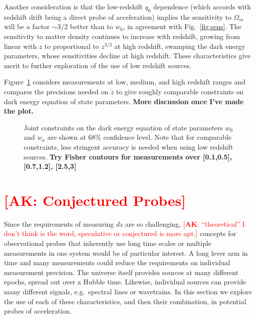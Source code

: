 \documentclass[preprint2, 10pt]{aastex}
\newcommand{\alex}[1]{\textcolor{red}{[{\bf AK}: #1]}}
\newcommand{\om}{\Omega_m}
\begin{document}
Another consideration is that the low-redshift $q_0$ dependence (which 
accords with redshift drift being a direct probe of acceleration) implies 
the sensitivity to $\om$ will be a factor $\sim3/2$ better than to $w_0$, 
in agreement with Fig.~\ref{fig:sens}. The sensitivity to matter density 
continues to increase with redshift, growing from linear with $z$ to 
proportional to $z^{3/2}$ at high redshift, swamping the dark energy 
parameters, whose sensitivities decline at high redshift. These 
characteristics give merit to further exploration of the use of 
low redshift sources. 

Figure~\ref{fig:fisher} considers measurements at low, medium, and 
high redshift ranges and compares the precisions needed on $\dot z$ to 
give roughly comparable constraints on dark energy equation of state 
parameters. 
{\bf More discussion once I've made the plot.} 


\begin{figure}
   \centering
\caption{Joint constraints on the dark energy equation of state parameters 
$w_0$ and $w_a$ are shown at 68\% confidence level. Note that for comparable 
constraints, less stringent accuracy is needed when using low redshift 
sources. 
{\bf Try Fisher contours for measurements over [0.1,0.5], [0.7,1.2], [2.5,3]} 
}
\label{fig:fisher} 
\end{figure}




\section{\alex{Conjectured Probes}} \label{sec:methods} 

Since the requirements of measuring $dz$ are so challenging, \alex{``theoretical'' I don't think
is the word, speculative or  conjectured is more apt.}
concepts for observational probes that inherently use long time scales or 
multiple measurements in one system would be of particular interest. 
A long lever arm in time and many measurements could reduce the requirements 
on individual measurement precision.  The universe itself provides sources 
at many different epochs, spread out over a Hubble time.  Likewise, 
individual sources can provide many different signals, e.g.\ spectral lines 
or wavetrains.  In this section we explore the use of each of these 
characteristics, and then their combination, in potential probes of 
acceleration. 
\end{document}
